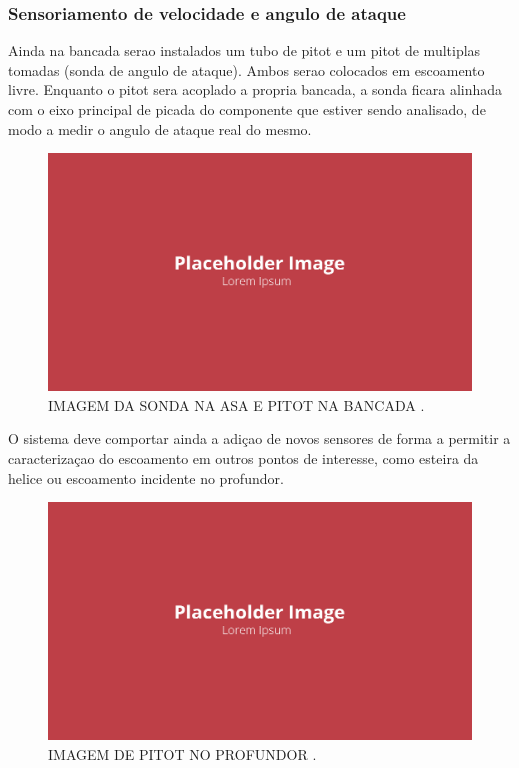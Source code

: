 \subsubsection{Sensoriamento de velocidade e angulo de ataque}

Ainda na bancada serao instalados um tubo de pitot e um pitot de multiplas tomadas (sonda de angulo de ataque). Ambos serao colocados em escoamento livre. Enquanto o pitot sera acoplado a propria bancada, a sonda ficara alinhada com o eixo principal de picada do componente que estiver sendo analisado, de modo a medir o angulo de ataque real do mesmo. 

\begin{figure}[!ht]
    \centering
    \includegraphics[width=.8\linewidth]{figuras/placeholder.png}
    \caption{IMAGEM DA SONDA NA ASA E PITOT NA BANCADA \cite{autor}.}
    \label{fig:placeholder}
\end{figure}

O sistema deve comportar ainda a adiçao de novos sensores de forma a permitir a caracterizaçao do escoamento em outros pontos de interesse, como esteira da helice ou escoamento incidente no profundor.

\begin{figure}[!ht]
    \centering
    \includegraphics[width=.8\linewidth]{figuras/placeholder.png}
    \caption{IMAGEM DE PITOT NO PROFUNDOR \cite{autor}.}
    \label{fig:placeholder}
\end{figure}

